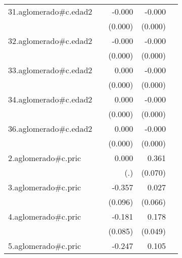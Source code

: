 {\begin{longtable}{l*{4}{D{.}{.}{-1}}}
\addlinespace
31.aglomerado#c.edad2&                     &      -0.000         &      -0.000\sym{***}&                     \\
            &                     &     (0.000)         &     (0.000)         &                     \\
\addlinespace
32.aglomerado#c.edad2&                     &      -0.000         &      -0.000\sym{***}&                     \\
            &                     &     (0.000)         &     (0.000)         &                     \\
\addlinespace
33.aglomerado#c.edad2&                     &       0.000         &      -0.000\sym{***}&                     \\
            &                     &     (0.000)         &     (0.000)         &                     \\
\addlinespace
34.aglomerado#c.edad2&                     &       0.000         &      -0.000\sym{*}  &                     \\
            &                     &     (0.000)         &     (0.000)         &                     \\
\addlinespace
36.aglomerado#c.edad2&                     &       0.000         &      -0.000         &                     \\
            &                     &     (0.000)         &     (0.000)         &                     \\
\addlinespace
2.aglomerado#c.pric&                     &       0.000         &       0.361\sym{***}&                     \\
            &                     &         (.)         &     (0.070)         &                     \\
\addlinespace
3.aglomerado#c.pric&                     &      -0.357\sym{***}&       0.027         &                     \\
            &                     &     (0.096)         &     (0.066)         &                     \\
\addlinespace
4.aglomerado#c.pric&                     &      -0.181\sym{*}  &       0.178\sym{***}&                     \\
            &                     &     (0.085)         &     (0.049)         &                     \\
\addlinespace
5.aglomerado#c.pric&                     &      -0.247\sym{**} &       0.105         &                     \\

\end{longtable}}

